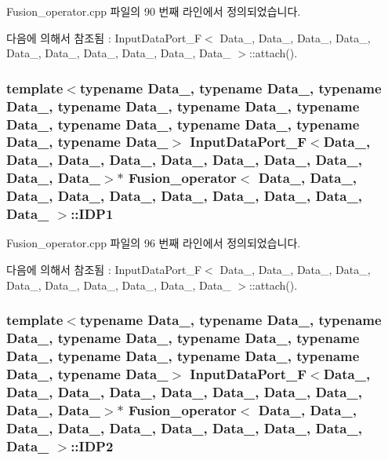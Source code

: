 Fusion\+\_\+operator.\+cpp 파일의 90 번째 라인에서 정의되었습니다.



다음에 의해서 참조됨 \+:  Input\+Data\+Port\+\_\+\+F$<$ Data\+\_, Data\+\_, Data\+\_, Data\+\_, Data\+\_, Data\+\_, Data\+\_, Data\+\_, Data\+\_, Data\+\_ $>$\+::attach().

\subsubsection[{\texorpdfstring{I\+D\+P1}{IDP1}}]{\setlength{\rightskip}{0pt plus 5cm}template$<$typename Data\+\_, typename Data\+\_, typename Data\+\_, typename Data\+\_, typename Data\+\_, typename Data\+\_, typename Data\+\_, typename Data\+\_, typename Data\+\_, typename Data\+\_$>$ {\bf Input\+Data\+Port\+\_\+F}$<$Data\+\_, Data\+\_, Data\+\_, Data\+\_, Data\+\_, Data\+\_, Data\+\_, Data\+\_, Data\+\_, Data\+\_$>$$\ast$ {\bf Fusion\+\_\+operator}$<$ Data\+\_, Data\+\_, Data\+\_, Data\+\_, Data\+\_, Data\+\_, Data\+\_, Data\+\_, Data\+\_, Data\+\_ $>$\+::I\+D\+P1}\hypertarget{classFusion__operator_a758f7524bb515cb07df2cbac6b06cef4}{}\label{classFusion__operator_a758f7524bb515cb07df2cbac6b06cef4}


Fusion\+\_\+operator.\+cpp 파일의 96 번째 라인에서 정의되었습니다.



다음에 의해서 참조됨 \+:  Input\+Data\+Port\+\_\+\+F$<$ Data\+\_, Data\+\_, Data\+\_, Data\+\_, Data\+\_, Data\+\_, Data\+\_, Data\+\_, Data\+\_, Data\+\_ $>$\+::attach().

\subsubsection[{\texorpdfstring{I\+D\+P2}{IDP2}}]{\setlength{\rightskip}{0pt plus 5cm}template$<$typename Data\+\_, typename Data\+\_, typename Data\+\_, typename Data\+\_, typename Data\+\_, typename Data\+\_, typename Data\+\_, typename Data\+\_, typename Data\+\_, typename Data\+\_$>$ {\bf Input\+Data\+Port\+\_\+F}$<$Data\+\_, Data\+\_, Data\+\_, Data\+\_, Data\+\_, Data\+\_, Data\+\_, Data\+\_, Data\+\_, Data\+\_$>$$\ast$ {\bf Fusion\+\_\+operator}$<$ Data\+\_, Data\+\_, Data\+\_, Data\+\_, Data\+\_, Data\+\_, Data\+\_, Data\+\_, Data\+\_, Data\+\_ $>$\+::I\+D\+P2}\hypertarget{classFusion__operator_a1c237055f4af1bfed7d18f0f1620b5dc}{}\label{classFusion__operator_a1c237055f4af1bfed7d18f0f1620b5dc}


